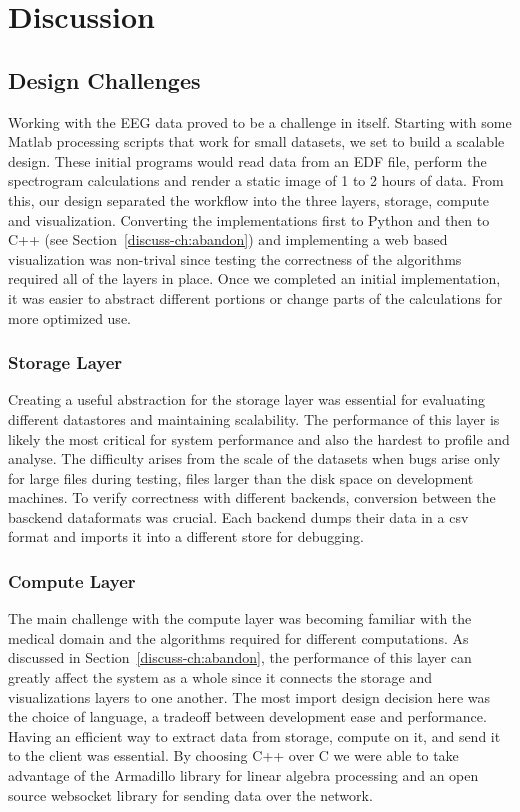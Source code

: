 \chapter{Discussion}\label{discuss-ch}

\section{Design Challenges}

Working with the EEG data proved to be a challenge in itself. Starting with
some Matlab processing scripts that work for small datasets, we set to build a
scalable design. These initial programs would read data from an EDF file,
perform the spectrogram calculations and render a static image of 1 to 2 hours
of data. From this, our design separated the workflow into the three layers,
storage, compute and visualization. Converting the implementations first to
Python and then to C++ (see Section~\ref{discuss-ch:abandon}) and implementing
a web based visualization was non-trival since testing the correctness of the
algorithms required all of the layers in place. Once we completed an initial
implementation, it was easier to abstract different portions or change parts of
the calculations for more optimized use. \\

\subsection{Storage Layer}

Creating a useful abstraction for the storage layer was essential for
evaluating different datastores and maintaining scalability. The performance of
this layer is likely the most critical for system performance and also the
hardest to profile and analyse. The difficulty arises from the scale of the
datasets when bugs arise only for large files during testing, files larger than
the disk space on development machines. To verify correctness with different
backends, conversion between the basckend dataformats was crucial. Each backend
dumps their data in a csv format and imports it into a different store for
debugging.

\subsection{Compute Layer}

The main challenge with the compute layer was becoming familiar with the
medical domain and the algorithms required for different computations. As
discussed in Section~\ref{discuss-ch:abandon}, the performance of this layer
can greatly affect the system as a whole since it connects the storage and
visualizations layers to one another. The most import design decision here was
the choice of language, a tradeoff between development ease and performance.
Having an efficient way to extract data from storage, compute on it, and send
it to the client was essential. By choosing C++ over C we were able to take
advantage of the Armadillo \cite{arma} library for linear algebra processing
and an open source websocket library \cite{websocket-server} for sending data
over the network.


